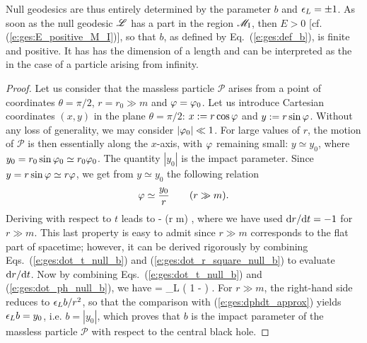 Null geodesics are thus entirely determined by the parameter
$b$ and $\epsilon_L = \pm 1$.
As soon as the null geodesic $\mathscr{L}$ has a part in the
region $\mathscr{M}_{\rm I}$, then $E>0$ [cf. (\ref{e:ges:E_positive_M_I})], so that
$b$, as defined by Eq.~(\ref{e:ges:def_b}), is finite and positive. It has
has the dimension of a length
and can be interpreted as the
 in the case of a
particle arising from infinity.
\begin{proof}
Let us consider that the massless
particle $\mathscr{P}$ arises from a point of coordinates $\theta=\pi/2$,
$r=r_0 \gg m$ and $\varphi = \varphi_0$.  Let us introduce
Cartesian coordinates $(x,y)$ in the plane $\theta=\pi/2$:
$x:=r\cos\varphi$ and $y:=r\sin\varphi$.
Without any loss of generality, we may
consider $|\varphi_0| \ll 1$. For large values of $r$, the motion of
$\mathscr{P}$ is then essentially along the $x$-axis, with $\varphi$ remaining small:
$y\simeq y_0$, where
$y_0 = r_0 \sin\varphi_0 \simeq r_0 \varphi_0$. The quantity
$|y_0|$ is the impact parameter.
Since $y=r\sin\varphi\simeq r\varphi$, we get from $y\simeq y_0$
the following relation
\[
    \varphi \simeq \frac{y_0}{r} \qquad (r \gg m) .
\]
Deriving with respect to $t$ leads to
\be \label{e:ges:dphdt_approx}
     \simeq -  
                  \simeq {}  \qquad (r \gg m) ,
\ee
where we have used $\mathrm{d} r / \mathrm{d} t = - 1$ for $r \gg m$. This last property is easy
to admit since
$r\gg m$ corresponds to the flat part of spacetime; however, it can be derived
rigorously by combining Eqs.~(\ref{e:ges:dot_t_null_b}) and
(\ref{e:ges:dot_r_square_null_b}) to evaluate $\mathrm{d} r / \mathrm{d} t$.
Now by combining Eqs.~(\ref{e:ges:dot_t_null_b}) and (\ref{e:ges:dot_ph_null_b}),
we have
\be
     = \eps_L  \left( 1 -  \right) .
\ee
For $r\gg m$, the right-hand side reduces to $\epsilon_L b/r^2$, so that the comparison
with (\ref{e:ges:dphdt_approx}) yields $\epsilon_L b = y_0$, i.e. $b = |y_0|$,
which proves that $b$ is the impact
parameter of the massless particle $\mathscr{P}$ with respect to the central
black hole.
\end{proof}

